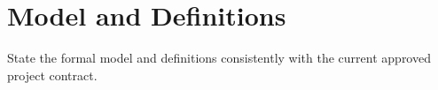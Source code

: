 \section{Model and Definitions}
\label{sec:model}

State the formal model and definitions consistently with the current approved
project contract.

